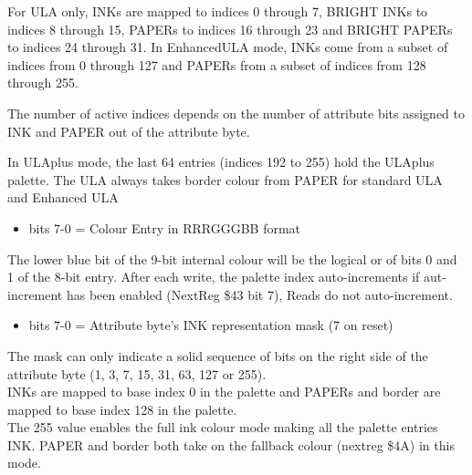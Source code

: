 For ULA only, INKs are mapped to indices 0 through 7, BRIGHT INKs to
indices 8 through 15, PAPERs to indices 16 through 23 and BRIGHT
PAPERs to indices 24 through 31.  In EnhancedULA mode, INKs come from
a subset of indices from 0 through 127 and PAPERs from a subset of
indices from 128 through 255.

The number of active indices depends on the number of attribute bits
assigned to INK and PAPER out of the attribute byte.

In ULAplus mode, the last 64 entries (indices 192 to 255) hold the
ULAplus palette.  The ULA always takes border colour from PAPER for
standard ULA and Enhanced ULA

\begin{itemize}
\item bits 7-0 = Colour Entry in RRRGGGBB format
\end{itemize}
The lower blue bit of the 9-bit internal colour will be the logical or
of bits 0 and 1 of the 8-bit entry. After each write, the palette
index auto-increments if aut-increment has been enabled (NextReg \$43
bit 7), Reads do not auto-increment.

\begin{itemize}
\item bits 7-0 = Attribute byte's INK representation mask (7 on reset)
\end{itemize}
The mask can only indicate a solid sequence of bits on the right side
of the attribute byte (1, 3, 7, 15, 31, 63, 127 or 255).\\
INKs are mapped to base index 0 in the palette and PAPERs and border
are mapped to base index 128 in the palette.\\
The 255 value enables the full ink colour mode making all the palette
entries INK. PAPER and border both take on the fallback colour
(nextreg \$4A) in this mode.

